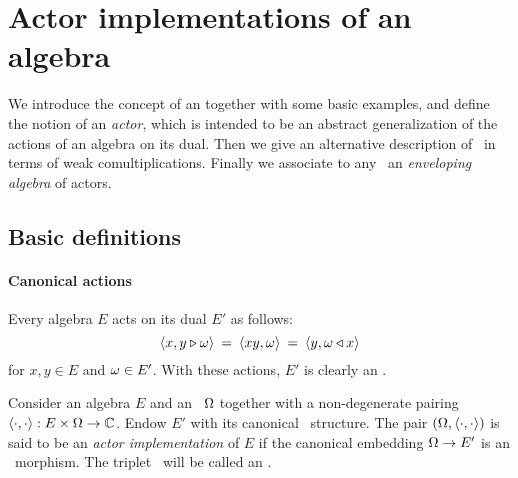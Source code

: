 
\section{Actor implementations of an algebra}

\begin{abs_chp}
We introduce the concept of an {\em \context\/} together with some basic examples,
and define the notion of an {\em actor}, which is intended to be an abstract
generalization of the actions of an algebra on its dual.
Then we give an alternative description of \contexts\ in terms of weak comultiplications.
Finally we associate to any \context\ an {\em enveloping algebra\/} of actors.
\end{abs_chp}



\subsection{Basic definitions}
               \label{sect:def_act_context}

\paragraph{Canonical actions}
Every algebra $E$ acts on its dual $E'$ as follows:
\begin{equation}\label{eq:def:canonical_actions}
  \langle x,y\triangleright \omega \rangle \:=\: \langle xy,\omega \rangle \:=\: \langle y,\omega\triangleleft x \rangle
\end{equation}
for $x,y \in E$ and $\omega \in E'$.
With these actions, $E'$ is clearly an \Ebimod\@.

\begin{defn} \label{def:actor_context}
  Consider an algebra $E$ and an \Ebimod\ $\Omega$ together with
  a non-degenerate pairing $\langle\cdot, \cdot\rangle : E \times \Omega \rightarrow \mathbb{C}$.
  Endow $E'$ with its canonical \Ebimod\ structure.
  The pair $(\Omega, \langle\cdot, \cdot\rangle)$ is said to be an {\em actor implementation\/} of $E$
  if the canonical embedding $\Omega \rightarrow E'$ is an \Ebimod\ morphism.
  The triplet \EOP\ will be called an {\em\context}.
\end{defn}



